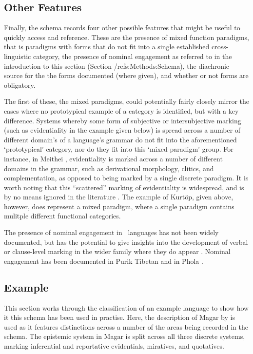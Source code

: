\subsection{Other Features}
Finally, the schema records four other possible features that might be useful to quickly access and reference. These are the presence of mixed function paradigms, that is paradigms with forms that do not fit into a single established cross-linguistic category, the presence of nominal engagement as referred to in the introduction to this section (Section /ref{s:Methods:Schema}), the diachronic source for the the forms documented (where given), and whether or not forms are obligatory.

The first of these, the mixed paradigms, could potentially fairly closely mirror the cases where no prototypical example of a category is identified, but with a key difference. Systems whereby some form of subjective or intersubjective marking (such as evidentiality in the example given below) is spread across a number of different domain's of a language's grammar do not fit into the aforementioned `prototypical' category, nor do they fit into this `mixed paradigm' group. For instance, in Meithei \cite[295]{Chelliah1997}, evidentiality is marked across a number of different domains in the grammar, such as derivational morphology, clitics, and complementation, as opposed to being marked by a single discrete paradigm. It is worth noting that this ``scattered'' marking of evidentiality is widespread, and is by no means ignored in the literature \cite[23]{Aikhenvald2014}. The example of Kurtöp, given above, however, does represent a mixed paradigm, where a single paradigm contains mulitple different functional categories.

The presence of nominal engagement in \lfam\ languages has not been widely documented, but has the potential to give insights into the development of verbal or clause-level marking in the wider family where they do appear . Nominal engagement has been documented in Purik Tibetan \cite[Tibetic: India:][]{Zemp2021} and in Phola \cite[Ngwi-Burmese, PRC:][]{GonzalezPerez2023}.


\subsection{Example}\label{ss:Methods:MagarExample}
This section works through the classification of an example language to show how it this schema has been used in practise. Here, the description of Magar by  is used as it features distinctions across a number of the areas being recorded in the schema. The epistemic system in Magar is split across all three discrete systems, marking inferential and reportative evidentials, miratives, and quotatives.

